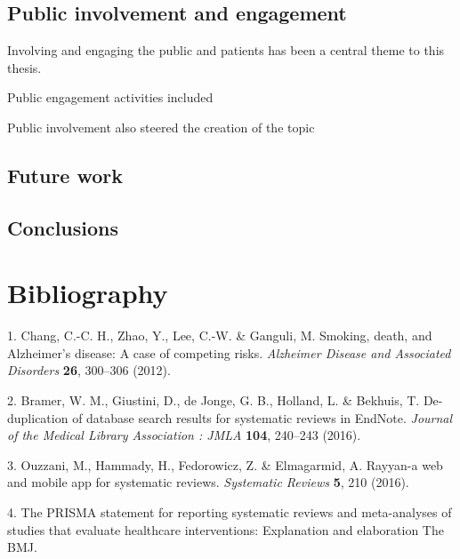 \documentclass[a4paper, nobind]{templates/ociamthesis}
\begin{document}
\hypertarget{public-involvement-and-engagement}{%
\section{Public involvement and engagement}\label{public-involvement-and-engagement}}

Involving and engaging the public and patients has been a central theme to this thesis.

Public engagement activities included

Public involvement also steered the creation of the topic

\hypertarget{future-work}{%
\section{Future work}\label{future-work}}

\hypertarget{conclusions}{%
\section{Conclusions}\label{conclusions}}

\hypertarget{bibliography}{%
\chapter{Bibliography}\label{bibliography}}

\hypertarget{refs}{}
\leavevmode\hypertarget{ref-chang2012}{}%
1. Chang, C.-C. H., Zhao, Y., Lee, C.-W. \& Ganguli, M. Smoking, death, and Alzheimer's disease: A case of competing risks. \emph{Alzheimer Disease and Associated Disorders} \textbf{26}, 300--306 (2012).

\leavevmode\hypertarget{ref-bramer2016}{}%
2. Bramer, W. M., Giustini, D., de Jonge, G. B., Holland, L. \& Bekhuis, T. De-duplication of database search results for systematic reviews in EndNote. \emph{Journal of the Medical Library Association : JMLA} \textbf{104}, 240--243 (2016).

\leavevmode\hypertarget{ref-ouzzani2016}{}%
3. Ouzzani, M., Hammady, H., Fedorowicz, Z. \& Elmagarmid, A. Rayyan-a web and mobile app for systematic reviews. \emph{Systematic Reviews} \textbf{5}, 210 (2016).

\leavevmode\hypertarget{ref-zotero-766}{}%
4. The PRISMA statement for reporting systematic reviews and meta-analyses of studies that evaluate healthcare interventions: Explanation and elaboration \textbar{} The BMJ.
\end{document}
